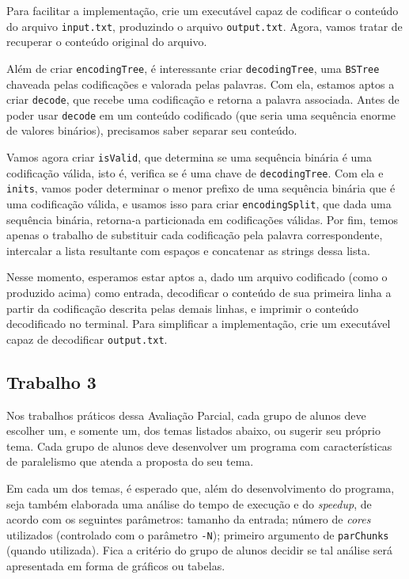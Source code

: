 \documentclass[a4paper]{article}
\begin{document}
Para facilitar a implementação, crie um executável capaz de codificar o conteúdo do arquivo \texttt{input.txt}, produzindo o arquivo \texttt{output.txt}.
Agora, vamos tratar de recuperar o conteúdo original do arquivo.

Além de criar \texttt{encodingTree}, é interessante criar \texttt{decodingTree}, uma \texttt{BSTree} chaveada pelas codificações e valorada pelas palavras.
Com ela, estamos aptos a criar \texttt{decode}, que recebe uma codificação e retorna a palavra associada.
Antes de poder usar \texttt{decode} em um conteúdo codificado (que seria uma sequência enorme de valores binários), precisamos saber separar seu conteúdo.

Vamos agora criar \texttt{isValid}, que determina se uma sequência binária é uma codificação válida, isto é, verifica se é uma chave de \texttt{decodingTree}.
Com ela e \texttt{inits}, vamos poder determinar o menor prefixo de uma sequência binária que é uma codificação válida, e usamos isso para criar \texttt{encodingSplit}, que dada uma sequência binária, retorna-a particionada em codificações válidas.
Por fim, temos apenas o trabalho de substituir cada codificação pela palavra correspondente, intercalar a lista resultante com espaços e concatenar as strings dessa lista.

Nesse momento, esperamos estar aptos a, dado um arquivo codificado (como o produzido acima) como entrada, decodificar o conteúdo de sua primeira linha a partir da codificação descrita pelas demais linhas, e imprimir o conteúdo decodificado no terminal.
Para simplificar a implementação, crie um executável capaz de decodificar \texttt{output.txt}.

\subsection{Trabalho 3}

Nos trabalhos práticos dessa Avaliação Parcial, cada grupo de alunos deve escolher um, e somente um, dos temas
listados abaixo, ou sugerir seu próprio tema.
Cada grupo de alunos deve desenvolver um programa com
características de paralelismo que atenda a proposta do seu tema.

Em cada um dos temas, é esperado que, além do desenvolvimento do programa, seja
também elaborada uma análise do tempo de execução e do \emph{speedup}, de acordo com os seguintes
parâmetros:
tamanho da entrada;
número de \emph{cores} utilizados (controlado com o parâmetro \texttt{-N});
primeiro argumento de \texttt{parChunks} (quando utilizada).
Fica a critério do grupo de alunos decidir se tal análise será apresentada em
forma de
gráficos ou tabelas.
\end{document}
